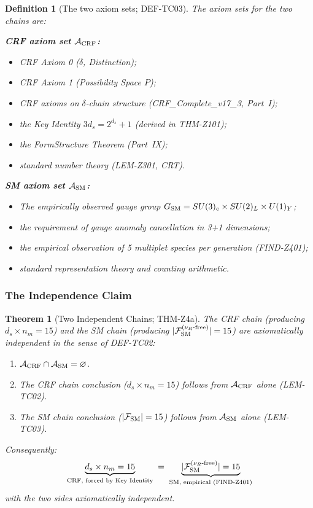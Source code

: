\documentclass[12pt, a4paper]{article}
\newtheorem{theorem}{Theorem}[section]
\newtheorem{definition}{Definition}[section]
\begin{document}
\begin{definition}[The two axiom sets; DEF-TC03]
\label{def:axiom-sets}
The axiom sets for the two chains are:

\medskip
\textbf{CRF axiom set $\mathcal{A}_{\rm CRF}$:}
\begin{itemize}[leftmargin=*, noitemsep]
  \item CRF Axiom 0 ($\delta$, Distinction);
  \item CRF Axiom 1 (Possibility Space $P$);
  \item CRF axioms on $\delta$-chain structure
    (CRF\_Complete\_v17\_3, Part~I);
  \item the Key Identity $3d_s = 2^{d_s}+1$ (derived in THM-Z101);
  \item the FormStructure Theorem (Part~IX);
  \item standard number theory (LEM-Z301, CRT).
\end{itemize}

\medskip
\textbf{SM axiom set $\mathcal{A}_{\rm SM}$:}
\begin{itemize}[leftmargin=*, noitemsep]
  \item The empirically observed gauge group
    $G_{\rm SM} = SU(3)_c \times SU(2)_L \times U(1)_Y$;
  \item the requirement of gauge anomaly cancellation in 3+1 dimensions;
  \item the empirical observation of 5 multiplet species per generation
    (FIND-Z401);
  \item standard representation theory and counting arithmetic.
\end{itemize}
\end{definition}

\subsubsection{The Independence Claim}

\begin{theorem}[Two Independent Chains; THM-Z4a]
\label{thm:independence}
The CRF chain (producing $d_s \times n_m = 15$) and the SM chain
(producing $|\mathcal{F}_{\rm SM}^{(\nu_R\text{-free})}| = 15$)
are axiomatically independent in the sense of DEF-TC02:
\begin{enumerate}[leftmargin=*, label=(\roman*)]
  \item $\mathcal{A}_{\rm CRF} \cap \mathcal{A}_{\rm SM} = \varnothing$.
  \item The CRF chain conclusion ($d_s \times n_m = 15$) follows
    from $\mathcal{A}_{\rm CRF}$ alone (LEM-TC02).
  \item The SM chain conclusion ($|\mathcal{F}_{\rm SM}| = 15$)
    follows from $\mathcal{A}_{\rm SM}$ alone (LEM-TC03).
\end{enumerate}
Consequently:
\begin{equation}
  \underbrace{d_s \times n_m = 15}_{\text{CRF, forced by Key Identity}}
  \;=\;
  \underbrace{|\mathcal{F}_{\rm SM}^{(\nu_R\text{-free})}| = 15}%
  _{\text{SM, empirical (FIND-Z401)}}
  \label{eq:main-equality}
\end{equation}
with the two sides axiomatically independent.
\end{theorem}
\end{document}
